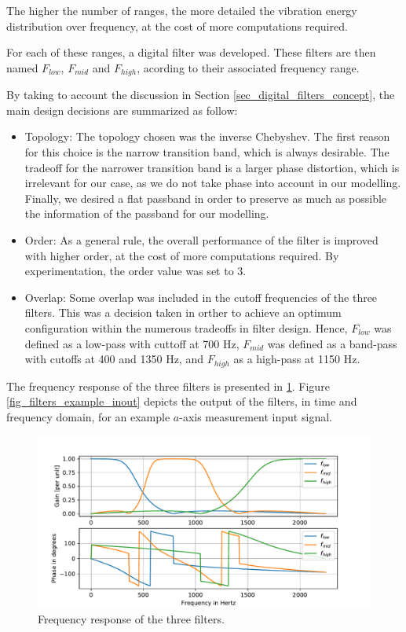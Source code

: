 \documentclass[conference]{IEEEtran}
\begin{document}
The higher the number of ranges, the more detailed the vibration energy distribution over frequency, at the cost of more computations required.

For each of these ranges, a digital filter was developed. These filters are then named $F_{low}$, $F_{mid}$ and $F_{high}$, acording to their associated frequency range.

By taking to account the discussion in Section \ref{sec_digital_filters_concept}, the main design decisions are summarized as follow:

\begin{itemize}
	\item Topology: The topology chosen was the inverse Chebyshev. The first reason for this choice is the narrow transition band, which is always desirable. The tradeoff for the narrower transition band is a larger phase distortion, which is irrelevant
	for our case, as we do not take phase into account in our modelling. Finally, we desired a flat passband in order to preserve as much as possible the information of the passband for our modelling.
	\item Order: As a general rule, the overall performance of the filter is improved with higher order, at the cost of more computations required. By experimentation, the	order value was set to 3.
	\item Overlap: Some overlap was included in the cutoff frequencies of the three filters. This was a decision taken in orther to achieve an optimum configuration within the numerous tradeoffs in filter design. Hence, $F_{low}$ was defined as a low-pass with cuttoff at 700 Hz, $F_{mid}$ was defined as a band-pass with cutoffs at 400 and 1350 Hz, and $F_{high}$ as a high-pass at 1150 Hz.
\end{itemize}

The frequency response of the three filters is presented in \ref{fig_filters_freq_response}. Figure \ref{fig_filters_example_inout} depicts the output of the filters, in time and frequency domain, for an example $a$-axis measurement input signal.

\begin{figure}[htbp]
\centerline{\includegraphics[width=\columnwidth]{graphics/filters_freqresponse/filters_freqresponse.pdf}}
\caption{Frequency response of the three filters.}
\label{fig_filters_freq_response}
\end{figure}
\end{document}
